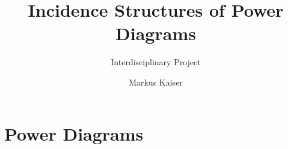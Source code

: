 


\title{Incidence Structures of Power Diagrams}
\subtitle{Interdisciplinary Project}
\author{Markus Kaiser}

\pagestyle{plain}



\maketitle
\begin{abstract}
    \blindtext
\end{abstract}

\section{Power Diagrams}
\label{sec:powerdiagrams}

